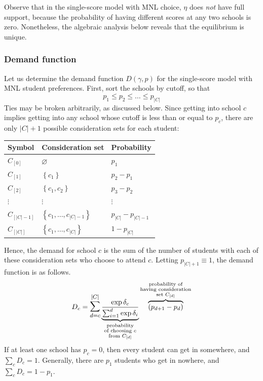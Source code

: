 \documentclass[12pt]{article}
\theoremstyle{definition}
\begin{document}
Observe that in the single-score model with MNL choice, $\eta$ does \emph{not} have full support, because the probability of having different scores at any two schools is zero. Nonetheless, the algebraic analysis below reveals that the equilibrium is unique.

\subsubsection{Demand function}
Let us determine the demand function $D(\gamma, p)$ for the single-score model with MNL student preferences. First, sort the schools by cutoff, so that
\[p_1 \leq p_2 \leq \dots \leq p_{|C|}\]
Ties may be broken arbitrarily, as discussed below. Since getting into school $c$ implies getting into any school whose cutoff is less than or equal to $p_c$, there are only $|C| + 1$ possible consideration sets for each student: 
\begin{center}
\begin{tabular}{lll}
\textbf{Symbol} & \textbf{Consideration set} & \textbf{Probability} \\ \hline
$C_{[0]}$    & $\varnothing$    & $p_1$                  \\
$C_{[1]}$    & $\left\{ c_1 \right\}$    & $p_2 - p_1$               \\
$C_{[2]}$    & $\left\{ c_1, c_2 \right\}$    & $p_3 - p_2$               \\
$\vdots$ & $\vdots$ & $\vdots$ \\
$C_{[|C| - 1]}$           & $\left\{ c_1, \dots, c_{|C| - 1} \right\}$     & $p_{|C|} - p_{|C|-1}$             \\
$C_{[|C|]}$           & $\left\{ c_1, \dots, c_{|C|} \right\}$     & $1 - p_{|C|}$                 
\end{tabular}
\end{center}
Hence, the demand for school $c$ is the sum of the number of students with each of these consideration sets who choose to attend $c$. Letting $p_{|C|+1} \equiv 1$, the demand function is as follows.
\begin{equation}D_c = \mathlarger{\mathlarger{\sum}}_{d=c}^{|C|} 
\underbrace{\frac{\exp{\delta_c}}{ \sum_{i=1}^d \exp{\delta_i}}}_{\substack{\text{probability} \\ \text{of choosing } c \\ \text{from }C_{[d]}}} 
\overbrace{\left(p_{d+1} - p_{d}\right)}^{\substack{\text{probability of}\\ \text{having consideration} \\ \text{set }C_{[d]}}} 
\label{mnlonetestdemand}\end{equation}
If at least one school has $p_c = 0$, then every student can get in somewhere, and $\sum_c D_c = 1$. Generally, there are $p_1$ students who get in nowhere, and $\sum_c D_c = 1 - p_1$.
\end{document}
